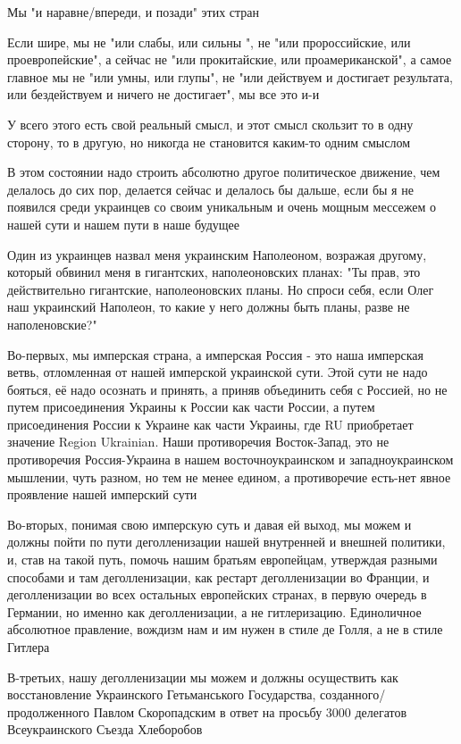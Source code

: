 \begin{itemize}
\begin{itemize}
Мы "и наравне/впереди, и позади" этих стран

Если шире, мы не "или слабы, или сильны ", не "или пророссийские, или
проевропейские", а сейчас не "или прокитайские, или проамериканской", а самое
главное мы не "или умны, или глупы", не "или действуем и достигает результата,
или бездействуем и ничего не достигает", мы все это и-и

У всего этого есть свой реальный смысл, и этот смысл скользит то в одну
сторону, то в другую, но никогда не становится каким-то одним смыслом

В этом состоянии надо строить абсолютно другое политическое движение, чем
делалось до сих пор, делается сейчас и делалось бы дальше, если бы я не
появился среди украинцев со своим уникальным и очень мощным мессежем о нашей
сути и нашем пути в наше будущее

Один из украинцев назвал меня украинским Наполеоном, возражая другому, который
обвинил меня в гигантских, наполеоновских планах: "Ты прав, это действительно
гигантские, наполеоновских планы. Но спроси себя, если Олег наш украинский
Наполеон, то какие у него должны быть планы, разве не наполеновские?"

Во-первых, мы имперская страна, а имперская Россия - это наша имперская ветвь,
отломленная от нашей имперской украинской сути. Этой сути не надо бояться, её
надо осознать и принять, а приняв объединить себя с Россией, но не путем
присоединения Украины к России как части России, а путем присоединения России к
Украине как части Украины, где RU приобретает значение Region Ukrainian. Наши
противоречия Восток-Запад, это не противоречия Россия-Украина в нашем
восточноукраинском и западноукраинском мышлении, чуть разном, но тем не менее
едином, а противоречие есть-нет явное проявление нашей имперский сути

Во-вторых, понимая свою имперскую суть и давая ей выход, мы можем и должны
пойти по пути деголленизации нашей внутренней и внешней политики, и, став на
такой путь, помочь нашим братьям европейцам, утверждая разными способами и там
деголленизации, как рестарт деголленизации во Франции, и деголленизации во всех
остальных европейских странах, в первую очередь в Германии, но именно как
деголленизации, а не гитлеризацию. Единоличное абсолютное правление, вождизм
нам и им нужен в стиле де Голля, а не в стиле Гитлера

В-третьих, нашу деголленизации мы можем и должны осуществить как восстановление
Украинского Гетьманського Государства, созданного/продолженного Павлом
Скоропадским в ответ на просьбу 3000 делегатов Всеукраинского Съезда Хлеборобов


\end{itemize}
\end{itemize}
